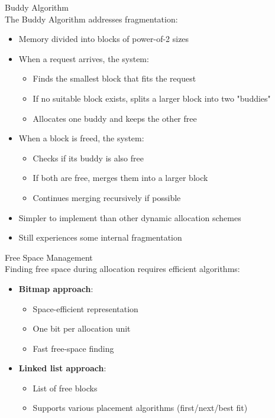 \begin{definition}{Buddy Algorithm}\\
    The Buddy Algorithm addresses fragmentation:
    \begin{itemize}
        \item Memory divided into blocks of power-of-2 sizes
        \item When a request arrives, the system:
            \begin{itemize}
                \item Finds the smallest block that fits the request
                \item If no suitable block exists, splits a larger block into two "buddies"
                \item Allocates one buddy and keeps the other free
            \end{itemize}
        \item When a block is freed, the system:
            \begin{itemize}
                \item Checks if its buddy is also free
                \item If both are free, merges them into a larger block
                \item Continues merging recursively if possible
            \end{itemize}
        \item Simpler to implement than other dynamic allocation schemes
        \item Still experiences some internal fragmentation
    \end{itemize}
\end{definition}

\begin{definition}{Free Space Management}\\
    Finding free space during allocation requires efficient algorithms:
    \begin{itemize}
        \item \textbf{Bitmap approach}:
            \begin{itemize}
                \item Space-efficient representation
                \item One bit per allocation unit
                \item Fast free-space finding
            \end{itemize}
        \item \textbf{Linked list approach}:
            \begin{itemize}
                \item List of free blocks
                \item Supports various placement algorithms (first/next/best fit)
            \end{itemize}
    \end{itemize}
\end{definition}

